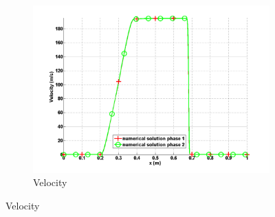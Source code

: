\documentclass{anstrans}
\begin{document}
\begin{figure}[H]
        \begin{subfigure}[b]{0.495\textwidth}
                \centering
                \includegraphics[width=\textwidth]{plots/relaxation_two_phases_velocity.png}
                \caption{Velocity}
                \label{fig:velocity}
        \end{subfigure}
\end{figure}
\end{document}

